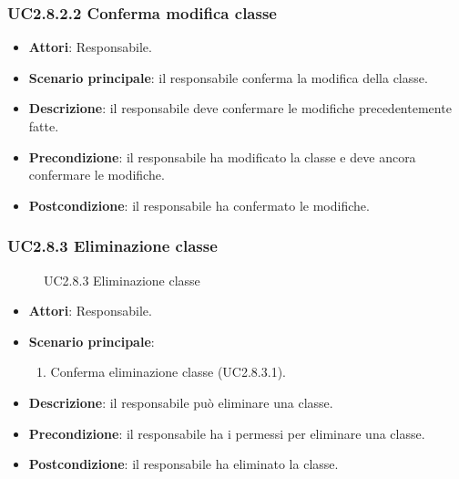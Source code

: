 \subsubsection{UC2.8.2.2 Conferma modifica classe}
\begin{itemize}
\item \textbf{Attori}: Responsabile.
\item \textbf{Scenario principale}: il responsabile conferma la modifica della classe.
\item \textbf{Descrizione}: il responsabile deve confermare le modifiche precedentemente fatte.
\item \textbf{Precondizione}: il responsabile ha modificato la classe e deve ancora confermare le modifiche.
\item \textbf{Postcondizione}: il responsabile ha confermato le modifiche.
\end{itemize}
\subsubsection{UC2.8.3 Eliminazione classe}
\begin{figure}[H]
\centering
\noindent{}
\caption{UC2.8.3 Eliminazione classe}
\end{figure}
\begin{itemize}
\item \textbf{Attori}: Responsabile.
\item \textbf{Scenario principale}:
\begin{enumerate}
\item Conferma eliminazione classe (UC2.8.3.1).
\end{enumerate}
\item \textbf{Descrizione}: il responsabile può eliminare una classe.
\item \textbf{Precondizione}: il responsabile ha i permessi per eliminare una classe.
\item \textbf{Postcondizione}: il responsabile ha eliminato la classe.
\end{itemize}
